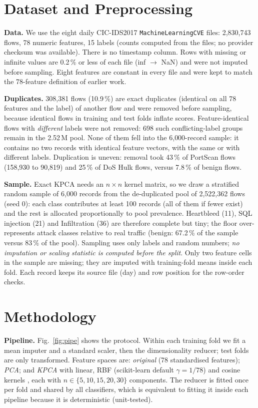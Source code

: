\documentclass[runningheads]{llncs}
\begin{document}
\section{Dataset and Preprocessing}\label{sec:data}
\textbf{Data.} We use the eight daily CIC-IDS2017 \texttt{MachineLearningCVE} files: 2{,}830{,}743 flows, 78 numeric features, 15 labels (counts computed from the files; no provider checksum was available). There is no timestamp column. Rows with missing or infinite values are 0.2\,\% or less of each file (inf $\to$ NaN) and were not imputed before sampling. Eight features are constant in every file and were kept to match the 78-feature definition of earlier work.

\textbf{Duplicates.} 308{,}381 flows (10.9\,\%) are exact duplicates (identical on all 78 features and the label) of another flow and were removed before sampling, because identical flows in training and test folds inflate scores. Feature-identical flows with \emph{different} labels were not removed: 698 such conflicting-label groups remain in the 2.52\,M pool. None of them fell into the 6{,}000-record sample: it contains no two records with identical feature vectors, with the same or with different labels. Duplication is uneven: removal took 43\,\% of PortScan flows (158{,}930 to 90{,}819) and 25\,\% of DoS Hulk flows, versus 7.8\,\% of benign flows.

\textbf{Sample.} Exact KPCA needs an $n\times n$ kernel matrix, so we draw a stratified random sample of 6{,}000 records from the de-duplicated pool of 2{,}522{,}362 flows (seed 0): each class contributes at least 100 records (all of them if fewer exist) and the rest is allocated proportionally to pool prevalence. Heartbleed (11), SQL injection (21) and Infiltration (36) are therefore complete but tiny; the floor over-represents attack classes relative to real traffic (benign: 67.2\,\% of the sample versus 83\,\% of the pool). Sampling uses only labels and random numbers; \emph{no imputation or scaling statistic is computed before the split}. Only two feature cells in the sample are missing; they are imputed with training-fold means inside each fold. Each record keeps its source file (day) and row position for the row-order checks.



\section{Methodology}\label{sec:method}
\textbf{Pipeline.} Fig.~\ref{fig:pipe} shows the protocol. Within each training fold we fit a mean imputer and a standard scaler, then the dimensionality reducer; test folds are only transformed. Feature spaces are: \emph{original} (78 standardised features); \emph{PCA}; and \emph{KPCA} with linear, RBF (scikit-learn default $\gamma=1/78$) and cosine kernels \cite{scholkopf1998}, each with $n\in\{5,10,15,20,30\}$ components. The reducer is fitted once per fold and shared by all classifiers, which is equivalent to fitting it inside each pipeline because it is deterministic (unit-tested).
\end{document}
